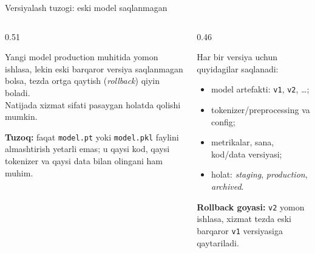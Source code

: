 \documentclass[aspectratio=169,11pt]{beamer}
\newcommand{\uzq}{\textquotesingle{}}   %
\begin{document}
\begin{frame}{Versiyalash tuzog\uzq{}i: eski model saqlanmagan}
  \small

  \begin{columns}[T,totalwidth=\textwidth]
    \begin{column}{0.51\textwidth}
      \begin{tcolorbox}[warnbox,title={Muammo},top=2pt,bottom=2pt]
        \footnotesize
        Yangi model production muhitida yomon ishlasa, lekin eski barqaror
        versiya saqlanmagan bo\uzq{}lsa, tezda ortga qaytish
        (\textit{rollback}) qiyin bo\uzq{}ladi.\\[3pt]

        Natijada xizmat sifati pasaygan holatda qolishi mumkin.
      \end{tcolorbox}

      \vspace{4pt}

      \begin{tcolorbox}[defbox,top=2pt,bottom=2pt]
        \footnotesize
        \textbf{Tuzoq:}
        faqat \texttt{model.pt} yoki \texttt{model.pkl} faylini almashtirish
        yetarli emas; u qaysi kod, qaysi tokenizer va qaysi data bilan
        olingani ham muhim.
      \end{tcolorbox}
    \end{column}

    \begin{column}{0.46\textwidth}
      \begin{tcolorbox}[okbox,title={Yechim: model reyestri},top=2pt,bottom=2pt]
        \footnotesize
        Har bir versiya uchun quyidagilar saqlanadi:
        \begin{itemize}\setlength\itemsep{1pt}
          \item model artefakti: \texttt{v1}, \texttt{v2}, \dots;
          \item tokenizer/preprocessing va config;
          \item metrikalar, sana, kod/data versiyasi;
          \item holat: \textit{staging}, \textit{production}, \textit{archived}.
        \end{itemize}
      \end{tcolorbox}

      \vspace{4pt}

      \begin{tcolorbox}[okbox,top=2pt,bottom=2pt]
        \footnotesize
        \textbf{Rollback g\uzq{}oyasi:}
        \texttt{v2} yomon ishlasa, xizmat tezda eski barqaror
        \texttt{v1} versiyasiga qaytariladi.
      \end{tcolorbox}
    \end{column}
  \end{columns}
\end{frame}
\end{document}
